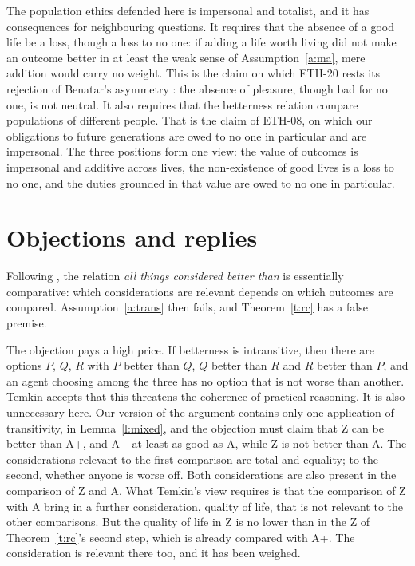 \documentclass{situationist-preprint}
\begin{document}
The population ethics defended here is impersonal and totalist, and it has consequences for neighbouring questions. It requires that the absence of a good life be a loss, though a loss to no one: if adding a life worth living did not make an outcome better in at least the weak sense of Assumption~\ref{a:ma}, mere addition would carry no weight. This is the claim on which ETH-20 rests its rejection of Benatar's asymmetry \citep{Benatar2006}: the absence of pleasure, though bad for no one, is not neutral. It also requires that the betterness relation compare populations of different people. That is the claim of ETH-08, on which our obligations to future generations are owed to no one in particular and are impersonal. The three positions form one view: the value of outcomes is impersonal and additive across lives, the non-existence of good lives is a loss to no one, and the duties grounded in that value are owed to no one in particular.

\section{Objections and replies}\label{s:objections}

\begin{objection}[Intransitivity]
Following \citet{Temkin2012}, the relation \emph{all things considered better than} is essentially comparative: which considerations are relevant depends on which outcomes are compared. Assumption~\ref{a:trans} then fails, and Theorem~\ref{t:rc} has a false premise.
\end{objection}

\begin{reply}
The objection pays a high price. If betterness is intransitive, then there are options $P$, $Q$, $R$ with $P$ better than $Q$, $Q$ better than $R$ and $R$ better than $P$, and an agent choosing among the three has no option that is not worse than another. Temkin accepts that this threatens the coherence of practical reasoning. It is also unnecessary here. Our version of the argument contains only one application of transitivity, in Lemma~\ref{l:mixed}, and the objection must claim that Z can be better than A+, and A+ at least as good as A, while Z is not better than A. The considerations relevant to the first comparison are total and equality; to the second, whether anyone is worse off. Both considerations are also present in the comparison of Z and A. What Temkin's view requires is that the comparison of Z with A bring in a further consideration, quality of life, that is not relevant to the other comparisons. But the quality of life in Z is no lower than in the Z of Theorem~\ref{t:rc}'s second step, which is already compared with A+. The consideration is relevant there too, and it has been weighed.
\end{reply}
\end{document}

